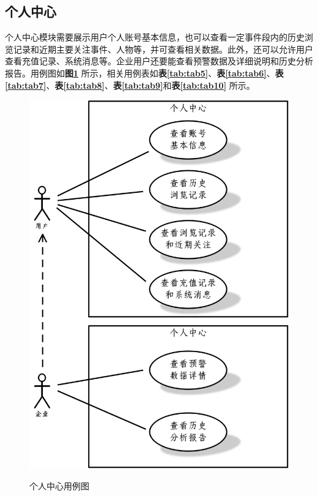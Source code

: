 \subsection{个人中心}

个人中心模块需要展示用户个人账号基本信息，也可以查看一定事件段内的历史浏览记录和近期主要关注事件、人物等，并可查看相关数据。此外，还可以允许用户查看充值记录、系统消息等。企业用户还要能查看预警数据及详细说明和历史分析报告。用例图如\textbf{图\ref{fig:fig2}} 所示，相关用例表如\textbf{表\ref{tab:tab5}}、\textbf{表\ref{tab:tab6}}、\textbf{表\ref{tab:tab7}}、\textbf{表\ref{tab:tab8}}、\textbf{表\ref{tab:tab9}}和\textbf{表\ref{tab:tab10}}  所示。

\begin{figure}[!htb]
	\centering\label{fig:fig2}
	\includegraphics[scale=0.5]{image/f2.png}
	\caption{个人中心用例图}
\end{figure}

